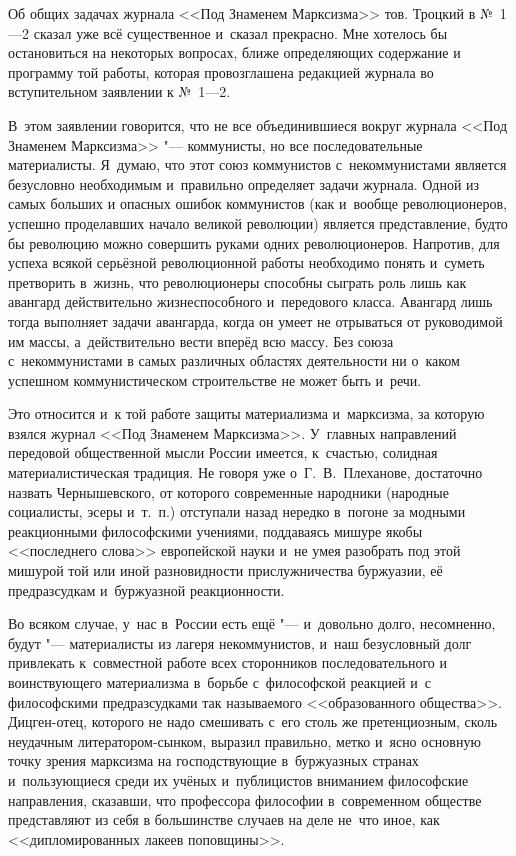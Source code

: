 Об общих задачах журнала <<Под Знаменем Марксизма>> тов. Троцкий в №~1---2
сказал уже всё существенное и~сказал прекрасно. Мне хотелось бы
остановиться на некоторых вопросах, ближе определяющих содержание и
программу той работы, которая провозглашена редакцией журнала во
вступительном заявлении к №~1---2.

В~этом заявлении говорится, что не все объединившиеся вокруг журнала <<Под
Знаменем Марксизма>> "--- коммунисты, но все последовательные материалисты.
Я~думаю, что этот союз коммунистов с~некоммунистами является безусловно
необходимым и~правильно определяет задачи журнала. Одной из самых больших и
опасных ошибок коммунистов (как и~вообще революционеров, успешно
проделавших начало великой революции) является представление, будто бы
революцию можно совершить руками одних революционеров. Напротив, для успеха
всякой серьёзной революционной работы необходимо понять и~суметь претворить
в~жизнь, что революционеры способны сыграть роль лишь как авангард
действительно жизнеспособного и~передового класса. Авангард лишь тогда
выполняет задачи авангарда, когда он умеет не отрываться от руководимой им
массы, а~действительно вести вперёд всю массу. Без союза с~некоммунистами в
самых различных областях деятельности ни о~каком успешном коммунистическом
строительстве не может быть и~речи.

Это относится и~к той работе защиты материализма и~марксизма, за которую
взялся журнал <<Под Знаменем Марксизма>>. У~главных направлений передовой
общественной мысли России имеется, к~счастью, солидная материалистическая
традиция. Не говоря уже о~Г.~В.~Плеханове, достаточно назвать
Чернышевского, от которого современные народники (народные социалисты,
эсеры и~т.~п.) отступали назад нередко в~погоне за модными реакционными
философскими учениями, поддаваясь мишуре якобы <<последнего слова>>
европейской науки и~не умея разобрать под этой мишурой той или иной
разновидности прислужничества буржуазии, её предразсудкам и~буржуазной
реакционности.

Во всяком случае, у~нас в~России есть ещё "--- и~довольно долго, несомненно,
будут "--- материалисты из лагеря некоммунистов, и~наш безусловный долг
привлекать к~совместной работе всех сторонников последовательного и
воинствующего материализма в~борьбе с~философской реакцией и~с философскими
предразсудками так называемого <<образованного общества>>. Дицген-отец,
которого не надо смешивать с~его столь же претенциозным, сколь неудачным
литератором-сынком, выразил правильно, метко и~ясно основную точку зрения
марксизма на господствующие в~буржуазных странах и~пользующиеся среди их
учёных и~публицистов вниманием философские направления, сказавши, что
профессора философии в~современном обществе представляют из себя в
большинстве случаев на деле не~что иное, как <<дипломированных лакеев
поповщины>>.

